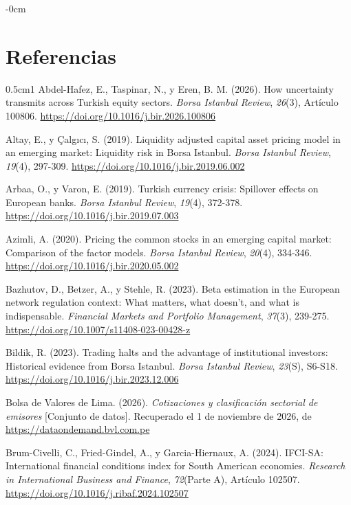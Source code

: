 \documentclass[jrfm,article,submit,oneauthor]{Definitions/mdpi}
\begin{document}
\begin{adjustwidth}{-\extralength}{0cm}
\section*{Referencias}
{\fontsize{9}{11}\selectfont\setlength{\parskip}{2pt}
\begin{hangparas}{0.5cm}{1}
Abdel-Hafez, E., Taspinar, N., y Eren, B. M. (2026). How uncertainty transmits across Turkish equity sectors. \textit{Borsa Istanbul Review}, \textit{26}(3), Artículo 100806. \url{https://doi.org/10.1016/j.bir.2026.100806}

Altay, E., y Çalgıcı, S. (2019). Liquidity adjusted capital asset pricing model in an emerging market: Liquidity risk in Borsa Istanbul. \textit{Borsa Istanbul Review}, \textit{19}(4), 297-309. \url{https://doi.org/10.1016/j.bir.2019.06.002}

Arbaa, O., y Varon, E. (2019). Turkish currency crisis: Spillover effects on European banks. \textit{Borsa Istanbul Review}, \textit{19}(4), 372-378. \url{https://doi.org/10.1016/j.bir.2019.07.003}

Azimli, A. (2020). Pricing the common stocks in an emerging capital market: Comparison of the factor models. \textit{Borsa Istanbul Review}, \textit{20}(4), 334-346. \url{https://doi.org/10.1016/j.bir.2020.05.002}

Bazhutov, D., Betzer, A., y Stehle, R. (2023). Beta estimation in the European network regulation context: What matters, what doesn't, and what is indispensable. \textit{Financial Markets and Portfolio Management}, \textit{37}(3), 239-275. \url{https://doi.org/10.1007/s11408-023-00428-z}

Bildik, R. (2023). Trading halts and the advantage of institutional investors: Historical evidence from Borsa Istanbul. \textit{Borsa Istanbul Review}, \textit{23}(S), S6-S18. \url{https://doi.org/10.1016/j.bir.2023.12.006}

Bolsa de Valores de Lima. (2026). \textit{Cotizaciones y clasificación sectorial de emisores} [Conjunto de datos]. Recuperado el 1 de noviembre de 2026, de \url{https://dataondemand.bvl.com.pe}

Brum-Civelli, C., Fried-Gindel, A., y Garcia-Hiernaux, A. (2024). IFCI-SA: International financial conditions index for South American economies. \textit{Research in International Business and Finance}, \textit{72}(Parte A), Artículo 102507. \url{https://doi.org/10.1016/j.ribaf.2024.102507}


\end{hangparas}}
\end{adjustwidth}
\end{document}
